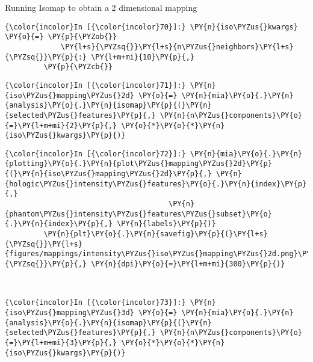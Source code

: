 Running Isomap to obtain a 2 dimensional mapping

    \begin{Verbatim}[commandchars=\\\{\}]
{\color{incolor}In [{\color{incolor}70}]:} \PY{n}{iso\PYZus{}kwargs} \PY{o}{=} \PY{p}{\PYZob{}}
             \PY{l+s}{\PYZsq{}}\PY{l+s}{n\PYZus{}neighbors}\PY{l+s}{\PYZsq{}}\PY{p}{:} \PY{l+m+mi}{10}\PY{p}{,}
         \PY{p}{\PYZcb{}}
\end{Verbatim}

    \begin{Verbatim}[commandchars=\\\{\}]
{\color{incolor}In [{\color{incolor}71}]:} \PY{n}{iso\PYZus{}mapping\PYZus{}2d} \PY{o}{=} \PY{n}{mia}\PY{o}{.}\PY{n}{analysis}\PY{o}{.}\PY{n}{isomap}\PY{p}{(}\PY{n}{selected\PYZus{}features}\PY{p}{,} \PY{n}{n\PYZus{}components}\PY{o}{=}\PY{l+m+mi}{2}\PY{p}{,} \PY{o}{*}\PY{o}{*}\PY{n}{iso\PYZus{}kwargs}\PY{p}{)}
\end{Verbatim}

    \begin{Verbatim}[commandchars=\\\{\}]
{\color{incolor}In [{\color{incolor}72}]:} \PY{n}{mia}\PY{o}{.}\PY{n}{plotting}\PY{o}{.}\PY{n}{plot\PYZus{}mapping\PYZus{}2d}\PY{p}{(}\PY{n}{iso\PYZus{}mapping\PYZus{}2d}\PY{p}{,} \PY{n}{hologic\PYZus{}intensity\PYZus{}features}\PY{o}{.}\PY{n}{index}\PY{p}{,}
                                      \PY{n}{phantom\PYZus{}intensity\PYZus{}features\PYZus{}subset}\PY{o}{.}\PY{n}{index}\PY{p}{,} \PY{n}{labels}\PY{p}{)}
         \PY{n}{plt}\PY{o}{.}\PY{n}{savefig}\PY{p}{(}\PY{l+s}{\PYZsq{}}\PY{l+s}{figures/mappings/intensity\PYZus{}iso\PYZus{}mapping\PYZus{}2d.png}\PY{l+s}{\PYZsq{}}\PY{p}{,} \PY{n}{dpi}\PY{o}{=}\PY{l+m+mi}{300}\PY{p}{)}
\end{Verbatim}

    \begin{center}
    \end{center}
    { \hspace*{\fill} \\}

    \begin{Verbatim}[commandchars=\\\{\}]
{\color{incolor}In [{\color{incolor}73}]:} \PY{n}{iso\PYZus{}mapping\PYZus{}3d} \PY{o}{=} \PY{n}{mia}\PY{o}{.}\PY{n}{analysis}\PY{o}{.}\PY{n}{isomap}\PY{p}{(}\PY{n}{selected\PYZus{}features}\PY{p}{,} \PY{n}{n\PYZus{}components}\PY{o}{=}\PY{l+m+mi}{3}\PY{p}{,} \PY{o}{*}\PY{o}{*}\PY{n}{iso\PYZus{}kwargs}\PY{p}{)}
\end{Verbatim}

